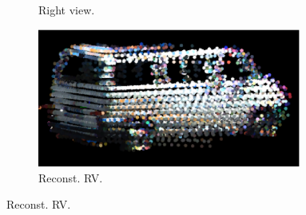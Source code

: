 \documentclass[10pt,twocolumn,letterpaper]{article}  %
\begin{document}
\begin{figure}[thpb]
\begin{subfigure}{0.25\textwidth}
  	\caption{Right view.}
  	\label{fig:rightSparse_car}
	\end{subfigure}%
	\begin{subfigure}{0.25\textwidth}
 	\centering
  	\includegraphics[height=0.05\textheight, width=0.95\textwidth]{image/rightDense_car.eps}%
  	\caption{Reconst. RV.}
  	\label{fig:rightDense_car} 
  	\end{subfigure}%
  	

\end{figure}
\end{document}
